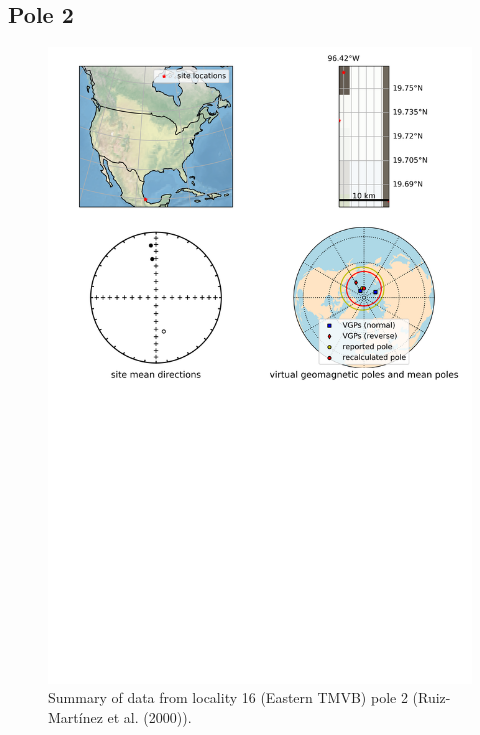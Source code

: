 \subsection{Pole 2}


\begin{figure}[H]
\centering
\includegraphics[width=5 in]{./16/2/pole_summary.png}
\caption{Summary of data from locality 16 (Eastern TMVB) pole 2 (Ruiz-Martínez et al. (2000)).}
\end{figure}

